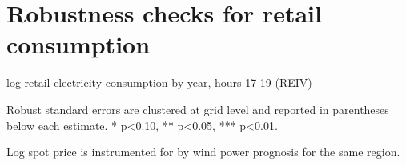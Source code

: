 \section{Robustness checks for retail consumption}
\label{app:robustness_retail}

\begin{table}[H]
\begin{threeparttable}
  \centering
  \caption{log retail electricity consumption by year, hours 17-19 (REIV)}
  \label{tab:r_year}
  \footnotesize
    
    \begin{tablenotes}
    \item Robust standard errors are clustered at grid level and reported in parentheses below each estimate. * p<0.10, ** p<0.05, *** p<0.01.
    \item Log spot price is instrumented for by wind power prognosis for the same region.
  \end{tablenotes}
\end{threeparttable}
\end{table}
